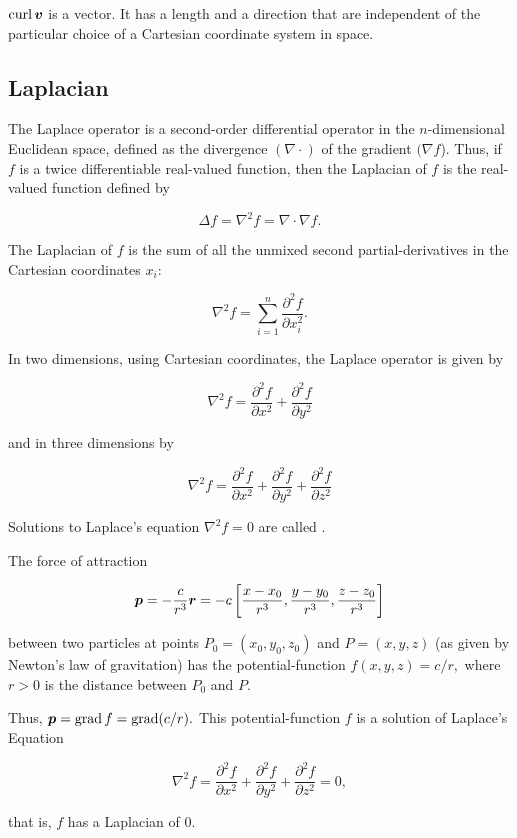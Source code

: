 \documentclass{article}
\begin{document}
\begin{theorem}\label{invariance-of-curl}
$\operatorname{curl}{\boldsymbol{v}}$ is a \@{vector}. It has a \@{length} and a \@{direction} that are independent of the particular choice of a Cartesian coordinate system in space.
\end{theorem}

\subsection{Laplacian}
\begin{definition}[Laplacian]
The Laplace operator is a second-order differential operator in the $n$-dimensional Euclidean space, defined as the \@{divergence} $(\nabla \cdot)$ of the \@{gradient} $(\nabla f$). Thus, if $f$ is a twice \@{differentiable} real-valued function, then the Laplacian of $f$ is the real-valued function defined by

\[ \Delta f = \nabla^2 f = \nabla \cdot \nabla f. \]

The Laplacian of $f$ is the sum of all the unmixed second \@{partial-derivatives} in the Cartesian coordinates $x_i$:

\[ \nabla^2 f = \sum_{i=1}^n \frac{\partial^2 f}{\partial x_i^2}. \]

In two dimensions, using Cartesian coordinates, the Laplace operator is given by

\[ \nabla^2 f = \frac{\partial^2 f}{\partial x^2} + \frac{\partial^2 f}{\partial y^2} \]

and in three dimensions by

\[ \nabla^2 f = \frac{\partial^2 f}{\partial x^2} + \frac{\partial^2 f}{\partial y^2} + \frac{\partial^2 f}{\partial z^2} \]
\end{definition}

\begin{note}
Solutions to Laplace's equation $\nabla^2 f = 0$ are called .
\end{note}

\begin{theorem}\label{gravitational-potential-is-a-solution-to-laplaces-equation}
The force of attraction

\[ \boldsymbol{p} = - \frac{c}{r^3} \boldsymbol{r} = -c \left[\frac{x - x_0}{r^3}, \frac{y - y_0}{r^3}, \frac{z - z_0}{r^3}\right] \]

between two particles at points $P_0 = (x_0, y_0, z_0)$ and $P = (x, y, z)$ (as given by Newton's law of gravitation) has the \@{potential-function} $f(x, y, z) = c/r,$ where $r > 0$ is the distance between $P_0$ and $P.$

Thus, $\boldsymbol{p} = \operatorname{grad}{f} = \operatorname{grad}(c/r).$ This \@{potential-function} $f$ is a solution of Laplace's Equation

\[ \nabla^2 f = \frac{\partial^2 f}{\partial x^2} + \frac{\partial^2 f}{\partial y^2} + \frac{\partial^2 f}{\partial z^2} = 0, \]

that is, $f$ has a \@{Laplacian} of $0.$
\end{theorem}
\end{document}
